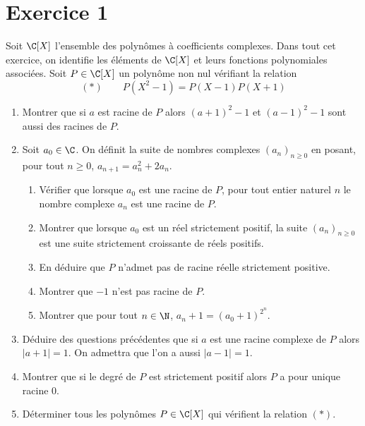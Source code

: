 \documentclass[twoside,french,11pt]{VcCours}
\begin{document}
\section*{Exercice 1}
Soit $\C[X]$ l'ensemble des polynômes à coefficients complexes. Dans tout cet  exercice, on identifie les éléments de $\C[X]$ et leurs fonctions polynomiales associées. Soit $P\in \C[X]$ un polynôme non nul vérifiant la relation
\[(*)\qquad P(X^2-1)=P(X-1)P(X+1)\]
\begin{enumerate}
\item Montrer que si $a$ est racine de $P$ alors $(a+1)^2-1$ et $(a-1)^2-1$ sont aussi des racines de $P$.
\item Soit $a_0\in \C$. On définit la suite de nombres complexes $(a_n)_{n\geq 0}$ en posant, pour tout $n\geq 0$, $a_{n+1}=a_n^2+2a_n$.
\begin{enumerate}
\item Vérifier que lorsque $a_0$ est une racine de $P$, pour tout entier naturel $n$ le nombre complexe $a_n$ est une racine de $P$.
\item Montrer que lorsque $a_0$ est un réel strictement positif, la suite $(a_n)_{n\geq 0}$ est une suite strictement croissante de réels positifs.
\item En déduire que $P$ n'admet pas de racine réelle strictement positive.
\item Montrer que $-1$ n'est pas racine de $P$.
\item Montrer que pour tout $n\in \N$, $a_{n}+1=(a_0+1)^{2^n}$.
\end{enumerate}
\item Déduire des questions précédentes que si $a$ est une racine complexe de $P$ alors $|a+1|=1$. On admettra que l'on a aussi $|a-1|=1$.
\item Montrer que si le degré de $P$ est strictement positif alors $P$ a pour unique racine $0$.
\item Déterminer tous les polynômes $P\in \C[X]$ qui vérifient la relation $(*)$.
\end{enumerate}
\end{document}
